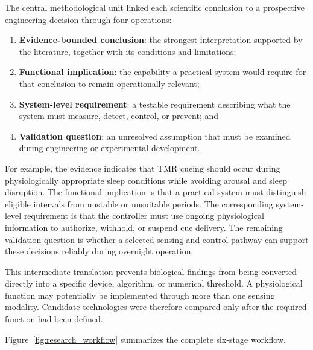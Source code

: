 The central methodological unit linked each scientific conclusion to a
prospective engineering decision through four operations:

\begin{enumerate}
    \item \textbf{Evidence-bounded conclusion}: the strongest interpretation
    supported by the literature, together with its conditions and limitations;

    \item \textbf{Functional implication}: the capability a practical system
    would require for that conclusion to remain operationally relevant;

    \item \textbf{System-level requirement}: a testable requirement describing
    what the system must measure, detect, control, or prevent; and

    \item \textbf{Validation question}: an unresolved assumption that must be
    examined during engineering or experimental development.
\end{enumerate}

For example, the evidence indicates that TMR cueing should occur during
physiologically appropriate sleep conditions while avoiding arousal and sleep
disruption. The functional implication is that a practical system must
distinguish eligible intervals from unstable or unsuitable periods. The
corresponding system-level requirement is that the controller must use ongoing
physiological information to authorize, withhold, or suspend cue delivery. The
remaining validation question is whether a selected sensing and control pathway
can support these decisions reliably during overnight operation.

This intermediate translation prevents biological findings from being converted
directly into a specific device, algorithm, or numerical threshold. A
physiological function may potentially be implemented through more than one
sensing modality. Candidate technologies were therefore compared only after the
required function had been defined.

Figure~\ref{fig:research_workflow} summarizes the complete six-stage workflow.

